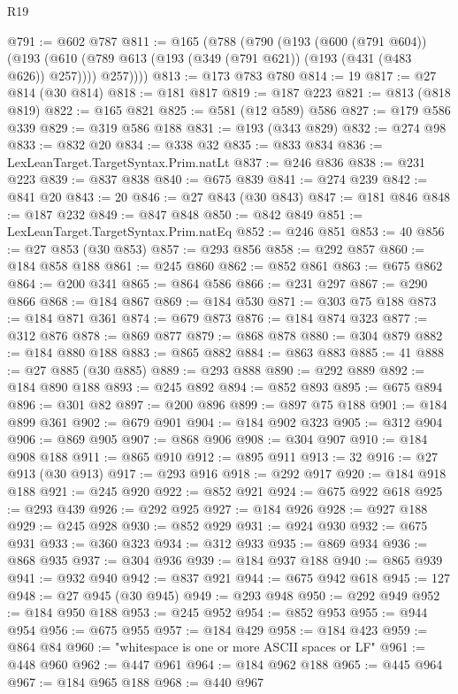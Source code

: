 \begin{lexlean}{R19}
\begin{coremodule}
@791 := @602 @787
@811 := @165
    (@788
      (@790
        (@193
          (@600 (@791 @604))
          (@193 (@610 (@789 @613 (@193 (@349 (@791 @621)) (@193 (@431 (@483 @626)) @257)))) @257))))
@813 := @173 @783 @780
@814 := 19
@817 := @27 @814 (@30 @814)
@818 := @181 @817
@819 := @187 @223
@821 := @813 (@818 @819)
@822 := @165 @821
@825 := @581 (@12 @589) @586
@827 := @179 @586 @339
@829 := @319 @586 @188
@831 := @193 (@343 @829)
@832 := @274 @98
@833 := @832 @20
@834 := @338 @32
@835 := @833 @834
@836 := LexLeanTarget.TargetSyntax.Prim.natLt
@837 := @246 @836
@838 := @231 @223
@839 := @837 @838
@840 := @675 @839
@841 := @274 @239
@842 := @841 @20
@843 := 20
@846 := @27 @843 (@30 @843)
@847 := @181 @846
@848 := @187 @232
@849 := @847 @848
@850 := @842 @849
@851 := LexLeanTarget.TargetSyntax.Prim.natEq
@852 := @246 @851
@853 := 40
@856 := @27 @853 (@30 @853)
@857 := @293 @856
@858 := @292 @857
@860 := @184 @858 @188
@861 := @245 @860
@862 := @852 @861
@863 := @675 @862
@864 := @200 @341
@865 := @864 @586
@866 := @231 @297
@867 := @290 @866
@868 := @184 @867
@869 := @184 @530
@871 := @303 @75 @188
@873 := @184 @871 @361
@874 := @679 @873
@876 := @184 @874 @323
@877 := @312 @876
@878 := @869 @877
@879 := @868 @878
@880 := @304 @879
@882 := @184 @880 @188
@883 := @865 @882
@884 := @863 @883
@885 := 41
@888 := @27 @885 (@30 @885)
@889 := @293 @888
@890 := @292 @889
@892 := @184 @890 @188
@893 := @245 @892
@894 := @852 @893
@895 := @675 @894
@896 := @301 @82
@897 := @200 @896
@899 := @897 @75 @188
@901 := @184 @899 @361
@902 := @679 @901
@904 := @184 @902 @323
@905 := @312 @904
@906 := @869 @905
@907 := @868 @906
@908 := @304 @907
@910 := @184 @908 @188
@911 := @865 @910
@912 := @895 @911
@913 := 32
@916 := @27 @913 (@30 @913)
@917 := @293 @916
@918 := @292 @917
@920 := @184 @918 @188
@921 := @245 @920
@922 := @852 @921
@924 := @675 @922 @618
@925 := @293 @439
@926 := @292 @925
@927 := @184 @926
@928 := @927 @188
@929 := @245 @928
@930 := @852 @929
@931 := @924 @930
@932 := @675 @931
@933 := @360 @323
@934 := @312 @933
@935 := @869 @934
@936 := @868 @935
@937 := @304 @936
@939 := @184 @937 @188
@940 := @865 @939
@941 := @932 @940
@942 := @837 @921
@944 := @675 @942 @618
@945 := 127
@948 := @27 @945 (@30 @945)
@949 := @293 @948
@950 := @292 @949
@952 := @184 @950 @188
@953 := @245 @952
@954 := @852 @953
@955 := @944 @954
@956 := @675 @955
@957 := @184 @429
@958 := @184 @423
@959 := @864 @84
@960 := "whitespace is one or more ASCII spaces or LF"
@961 := @448 @960
@962 := @447 @961
@964 := @184 @962 @188
@965 := @445 @964
@967 := @184 @965 @188
@968 := @440 @967

\end{coremodule}
\end{lexlean}

